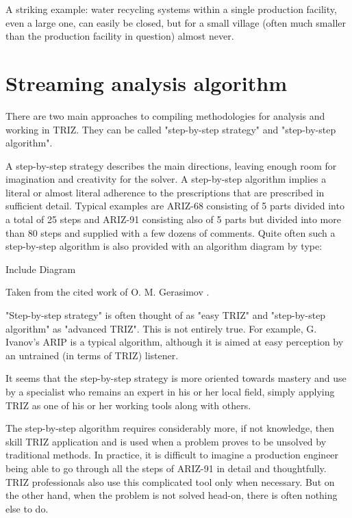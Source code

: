 \documentclass[a4paper,11pt]{article}
\begin{document}
A striking example: water recycling systems within a single production
facility, even a large one, can easily be closed, but for a small village
(often much smaller than the production facility in question) almost never.

\section{Streaming analysis algorithm}

There are two main approaches to compiling methodologies for analysis and
working in TRIZ.  They can be called "step-by-step strategy" and "step-by-step
algorithm".

A step-by-step strategy describes the main directions, leaving enough room for
imagination and creativity for the solver. A step-by-step algorithm implies a
literal or almost literal adherence to the prescriptions that are prescribed
in sufficient detail. Typical examples are ARIZ-68 \cite{B21} consisting of 5
parts divided into a total of 25 steps and ARIZ-91 \cite{B14} consisting also
of 5 parts but divided into more than 80 steps and supplied with a few dozens
of comments. Quite often such a step-by-step algorithm is also provided with
an algorithm diagram by type:
\begin{center}
  Include Diagram
\end{center}
Taken from the cited work of O. M. Gerasimov \cite{B9}.

"Step-by-step strategy" is often thought of as "easy TRIZ" and "step-by-step
algorithm" as "advanced TRIZ". This is not entirely true. For example,
G. Ivanov's ARIP \cite{B22} is a typical algorithm, although it is aimed at
easy perception by an untrained (in terms of TRIZ) listener.

It seems that the step-by-step strategy is more oriented towards mastery and
use by a specialist who remains an expert in his or her local field, simply
applying TRIZ as one of his or her working tools along with others.

The step-by-step algorithm requires considerably more, if not knowledge, then
skill TRIZ application and is used when a problem proves to be unsolved by
traditional methods. In practice, it is difficult to imagine a production
engineer being able to go through all the steps of ARIZ-91 in detail and
thoughtfully. TRIZ professionals also use this complicated tool only when
necessary. But on the other hand, when the problem is not solved head-on,
there is often nothing else to do.
\end{document}
